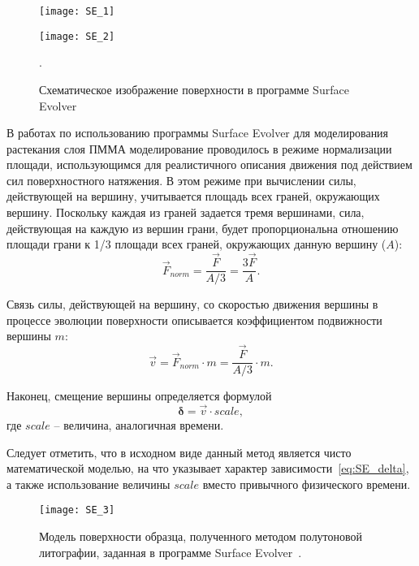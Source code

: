 \begin{figure}
	\begin{minipage}{0.55\textwidth}
		\texttt{[image: SE\_1]}
	\end{minipage}
	\begin{minipage}{0.4\textwidth}
		\texttt{[image: SE\_2]}
	\end{minipage}
	\caption{Схематическое изображение поверхности в программе \textquotedbl Surface Evolver\textquotedbl{}}.
	\label{fig:SE_12}
\end{figure}

В работах по использованию программы \textquotedbl Surface Evolver\textquotedbl{} для моделирования растекания слоя ПММА моделирование проводилось в режиме нормализации площади, использующимся для реалистичного описания движения под действием сил поверхностного натяжения. В этом режиме при вычислении силы, действующей на вершину, учитывается площадь всех граней, окружающих вершину. Поскольку каждая из граней задается тремя вершинами,
сила, действующая на каждую из вершин грани, будет пропорциональна отношению площади грани к 1/3 площади всех граней, окружающих данную вершину ($A$):
\begin{equation}
	\vec{F}_{norm} = \frac{\vec{F}}{A/3} = \frac{3\vec{F}}{A}.
\end{equation}

Связь силы, действующей на вершину, со скоростью движения вершины в процессе эволюции поверхности описывается коэффициентом подвижности вершины $m$:
\begin{equation}
	\vec{v} = \vec{F}_{norm} \cdot m = \frac{\vec{F}}{A/3} \cdot m.
\end{equation}

Наконец, смещение вершины определяется формулой
\begin{equation} \label{eq:SE_delta}
	\boldsymbol{\delta} = \vec{v} \cdot scale,
\end{equation}
где $scale$ -- величина, аналогичная времени.

Следует отметить, что в исходном виде данный метод является чисто математической моделью, на что указывает характер зависимости~\ref{eq:SE_delta}, а также использование величины $scale$ вместо привычного \textquotedbl физического\textquotedbl{} времени.
\begin{figure}[t!]
	\begin{center}
		\texttt{[image: SE\_3]}
		\caption{Модель поверхности образца, полученного методом полутоновой литографии, заданная в программе \textquotedbl Surface Evolver\textquotedbl{}~\cite{Kirchner_reflow}.}
		\label{fig:SE_3}
	\end{center}
\end{figure}





